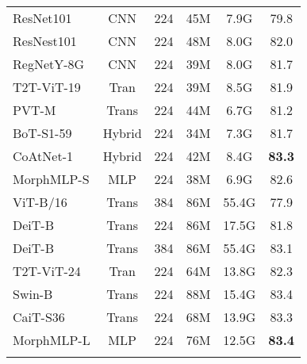 \documentclass[runningheads]{llncs}
\begin{document}
\begin{table}[t]
\begin{subtable}[t]{0.48\linewidth}
{\begin{tabular}{l | c |c c c|c}
ResNet101 \cite{resnet}                &  CNN  & 224 & 45M & 7.9G & 79.8 \\
ResNest101\cite{resnest}& CNN & 224 & 48M &8.0G &82.0\\
RegNetY-8G \cite{regnet}  &  CNN  & 224 & 39M & 8.0G & 81.7 \\
T2T-ViT-19 \cite{t2t} & Tran & 224 & 39M & 8.5G & 81.9 \\
PVT-M \cite{pvt}                & Trans & 224 & 44M & 6.7G & 81.2 \\
BoT-S1-59 \cite{botnet}     & Hybrid& 224 & 34M & 7.3G & 81.7  \\
CoAtNet-1\cite{coatnet}     &Hybrid &224&42M&8.4G &\textbf{83.3} \\
	\rowcolor{gray!20}
MorphMLP-S                             & MLP   & 224 & 38M & 6.9G & 82.6 \\ \hline

ViT-B/16 \cite{deit}       & Trans & 384 & 86M & 55.4G & 77.9 \\
DeiT-B \cite{deit}         & Trans & 224 & 86M & 17.5G & 81.8 \\
DeiT-B \cite{deit}         & Trans & 384 & 86M & 55.4G & 83.1 \\
T2T-ViT-24 \cite{t2t} & Tran & 224 & 64M & 13.8G & 82.3 \\
Swin-B \cite{swin}         & Trans & 224 & 88M & 15.4G & 83.4 \\
CaiT-S36  \cite{cait}        & Trans & 224 & 68M & 13.9G & 83.3   \\
	\rowcolor{gray!20}
MorphMLP-L  & MLP   & 224 & 76M & 12.5G & \textbf{83.4} \\ 
\Xhline{1.0pt}
     \end{tabular}  }
      \label{sota_in1k}
    \end{subtable}
    \label{in1k}
    
\end{table}
\end{document}

